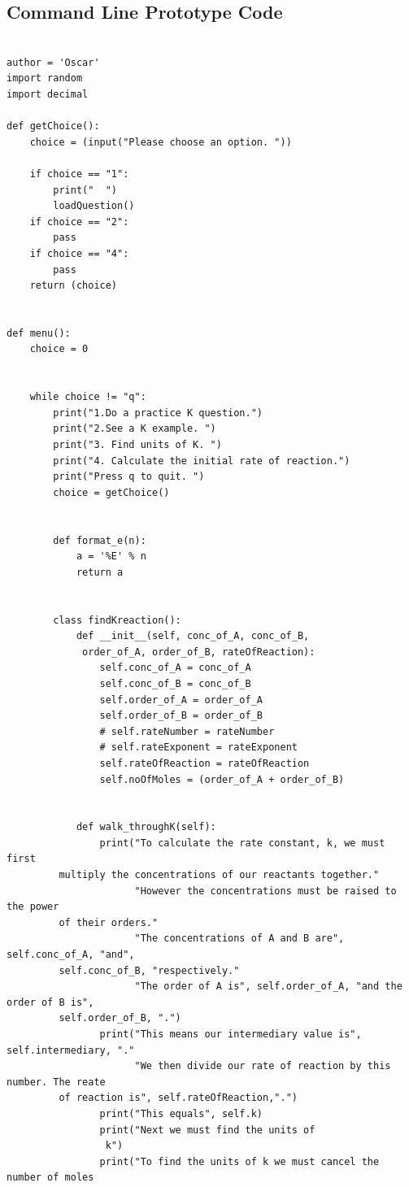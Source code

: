 \documentclass[a4paper,12pt]{report}
\begin{document}
\subsection{Command Line Prototype Code}

\begin{lstlisting}[style = customc]

author = 'Oscar'
import random
import decimal

def getChoice():
    choice = (input("Please choose an option. "))

    if choice == "1":
        print("  ")
        loadQuestion()
    if choice == "2":
        pass
    if choice == "4":
        pass
    return (choice)


def menu():
    choice = 0


    while choice != "q":
        print("1.Do a practice K question.")
        print("2.See a K example. ")
        print("3. Find units of K. ")
        print("4. Calculate the initial rate of reaction.")
        print("Press q to quit. ")
        choice = getChoice()
        
        
        def format_e(n):
            a = '%E' % n
            return a
        
        
        class findKreaction():
            def __init__(self, conc_of_A, conc_of_B,
             order_of_A, order_of_B, rateOfReaction):
                self.conc_of_A = conc_of_A
                self.conc_of_B = conc_of_B
                self.order_of_A = order_of_A
                self.order_of_B = order_of_B
                # self.rateNumber = rateNumber
                # self.rateExponent = rateExponent
                self.rateOfReaction = rateOfReaction
                self.noOfMoles = (order_of_A + order_of_B)
                
                
            def walk_throughK(self):
                print("To calculate the rate constant, k, we must first 
		 multiply the concentrations of our reactants together."
                      "However the concentrations must be raised to the power
		 of their orders."
                      "The concentrations of A and B are", self.conc_of_A, "and",
		 self.conc_of_B, "respectively."
                      "The order of A is", self.order_of_A, "and the order of B is",
		 self.order_of_B, ".")
                print("This means our intermediary value is", self.intermediary, "."
                      "We then divide our rate of reaction by this number. The reate
		 of reaction is", self.rateOfReaction,".")
                print("This equals", self.k)
                print("Next we must find the units of
                 k")
                print("To find the units of k we must cancel the number of moles
        

\end{lstlisting}
\end{document}
